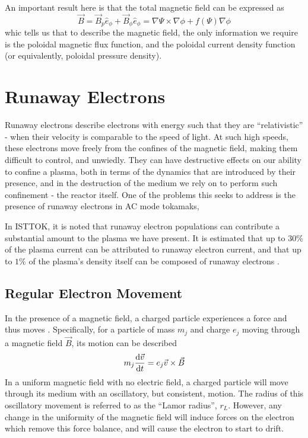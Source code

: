 \begin{remark}
    An important result here is that the total magnetic field can be expressed as 
    \begin{equation*}
        \vec{B} = \vec{B}_p \hat{e}_{\phi} + \vec{B}_{\phi} \hat{e}_{\phi}  = \nabla \Psi \times \nabla \phi + f(\Psi) \nabla \phi
    \end{equation*}
    whic tells us that to describe the magnetic field, the only information we require is 
    the poloidal magnetic flux function, and the poloidal current density function (or equivalently, 
    poloidal pressure density). 
\end{remark}


\section{Runaway Electrons}

Runaway electrons describe electrons with energy such that they are ``relativistic'' - when their velocity 
is comparable to the speed of light. At such high speeds, these electrons move freely from the confines of the 
magnetic field, making them difficult to control, and unwiedly. They can have destructive effects on our ability to confine 
a plasma, both in terms of the dynamics that are introduced by their presence, and in the destruction of the medium we rely 
on to perform such confinement - the reactor itself. One of the problems this seeks to address is the presence of runaway electrons 
in AC mode tokamaks, 

In ISTTOK, it is noted that runaway electron populations can contribute a substantial amount to the plasma we have present. 
It is estimated that up to $30\%$ of the plasma current can be attributed to runaway electron current, and that up to $1\%$ of 
the plasma's density itself can be composed of runaway electrons \cite{isttok-runaways}. 

\subsection{Regular Electron Movement}

In the presence of a magnetic field, a charged particle experiences a force and thus moves \cite{wesson-tokamaks}. Specifically, for a 
particle of mass $m_j$ and charge $e_j$ moving through a magnetic field $\vec{B}$, its motion can be described
$$m_j \dv{\vec{v}}{t} = e_j \vec{v} \times \vec{B}$$
In a uniform magnetic field with no electric field, a charged particle will move through its medium with an 
oscillatory, but consistent, motion. The radius of this oscillatory movement is referred to as the ``Lamor radius'', $r_L$. 
However, any change in the uniformity of the magnetic field will induce 
forces on the electron which remove this force balance, and will cause the electron to start to drift.

